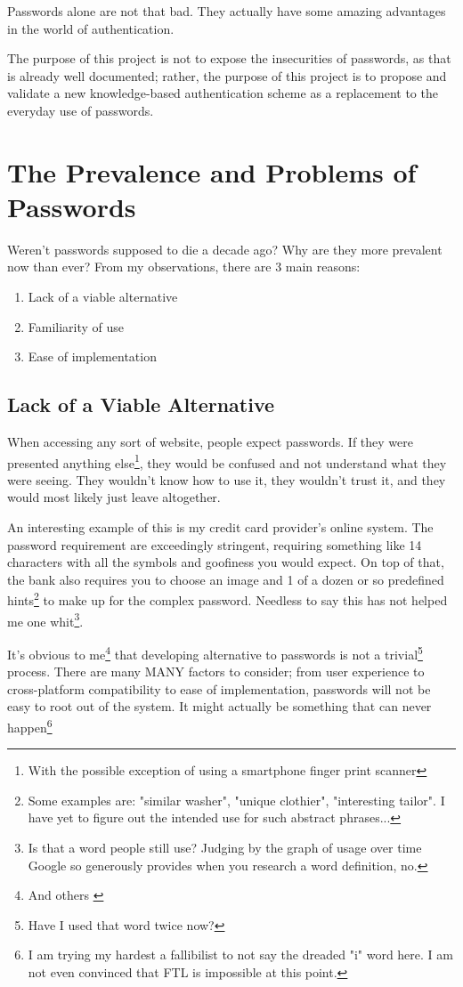 \documentclass[conference]{IEEEtran}
\begin{document}
	Passwords alone are not that bad. They actually have some amazing advantages in the world of authentication.
	
	The purpose of this project is not to expose the insecurities of passwords, as that is already well documented; rather, the purpose of this project is to propose and validate a new knowledge-based authentication scheme as a replacement to the everyday use of passwords.

\section{The Prevalence and Problems of Passwords}
	Weren't passwords supposed to die a decade ago\cite[Need to cite]{cite here}? Why are they more prevalent now than ever\cite[Need to cite]{cite here}? From my observations, there are 3 main reasons:
	\begin{enumerate}
		\item Lack of a viable alternative
		\item Familiarity of use
		\item Ease of implementation
	\end{enumerate}
\subsection{Lack of a Viable Alternative}
	When accessing any sort of website, people expect passwords. If they were presented anything else\footnote{With the possible exception of using a smartphone finger print scanner}, they would be confused and not understand what they were seeing. They wouldn't know how to use it, they wouldn't trust it, and they would most likely just leave altogether. 
	
	An interesting example of this is my credit card provider's online system. The password requirement are exceedingly stringent, requiring something like 14 characters with all the symbols and goofiness you would expect. On top of that, the bank also requires you to choose an image and 1 of a dozen or so predefined hints\footnote{Some examples are: "similar washer", "unique clothier", "interesting tailor". I have yet to figure out the intended use for such abstract phrases...} to make up for the complex password. Needless to say this has not helped me one whit\footnote{Is that a word people still use? Judging by the graph of usage over time Google so generously provides when you research a word definition, no.}.
	
	It's obvious to me\footnote{And others \cite{b1}} that developing alternative to passwords is not a trivial\footnote{Have I used that word twice now?} process. There are many MANY factors to consider; from user experience to cross-platform compatibility to ease of implementation, passwords will not be easy to root out of the system. It might actually be something that can never happen\footnote{I am trying my hardest a fallibilist to not say the dreaded "i" word here. I am not even convinced that FTL is impossible at this point.}
\end{document}
